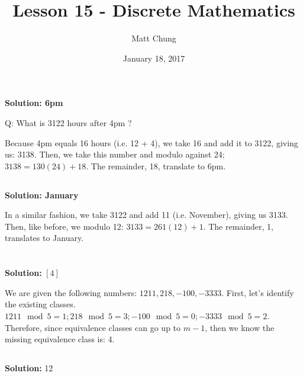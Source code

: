\documentclass{article}
\title{Lesson 15 - Discrete Mathematics}
\author{Matt Chung}
\date{January 18, 2017}
\begin{document}
\maketitle

\section{}

\subsection{}

\textbf{Solution: 6pm}

Q: What is 3122 hours after 4pm ?

Because 4pm equals 16 hours (i.e. 12 + 4), we take 16 and add it to 3122, giving us: 3138. Then, we take this number and modulo against 24; $3138 = 130(24) + 18$. The remainder, 18, translate to 6pm.

\subsection{}

\textbf{Solution: January}

In a similar fashion, we take 3122 and add 11 (i.e. November), giving us 3133. Then, like before, we modulo 12: $3133 = 261(12) + 1$. The remainder, 1, translates to January.

\section{}

\subsection{}

\textbf{Solution:} $[4]$

We are given the following numbers: $1211, 218, -100, -3333$. First, let's identify the existing classes. $1211 \mod 5 = 1; 218 \mod 5 = 3; -100 \mod 5 = 0; -3333 \mod 5 = 2$. Therefore, since equivalence classes can go up to $m-1$, then we know the missing equivalence class is: 4.

\subsection{}

\textbf{Solution: } 12
\end{document}
